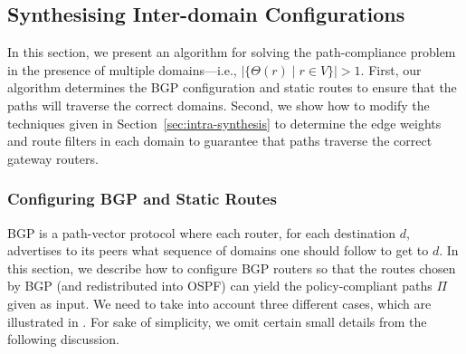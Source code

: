 \begin{figure}
	\centering
	\hfill
	\hfill
\end{figure}

\subsection{Synthesising Inter-domain Configurations}
\label{sec:inter-synthesis}


In this section, we present an algorithm for 
solving the path-compliance problem in the presence
of multiple domains---i.e., $|\{\Theta(r) \mid r\in V\}|>1$.
First, our algorithm determines the 
BGP configuration and static routes to ensure that the 
paths will traverse the correct domains.
Second, we show how to modify the 
techniques given in Section~\ref{sec:intra-synthesis}
to determine the edge weights and route filters
 in each domain to guarantee that paths traverse
the correct gateway routers.





\subsubsection{Configuring BGP and Static Routes}
BGP is a path-vector protocol where each router,
for each destination $d$,
advertises to its peers
what sequence of domains one should follow to get to  $d$.  
In this section, we describe how to configure
BGP routers so that the routes chosen by BGP (and redistributed into OSPF) 
can yield the policy-compliant
paths $\Pi$ given as input. 
We need to take into account three different
cases, which are illustrated in .  
For sake of simplicity, we omit certain small details from the following discussion.

